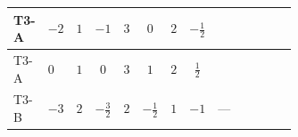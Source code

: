 \documentclass[8pt]{article}
\begin{document}
\begin{landscape}
\begin{longtable}{@{}llcccccc >{\raggedright\arraybackslash}p{0.21\linewidth} >{\raggedright\arraybackslash}p{0.21\linewidth} >{\raggedright\arraybackslash}p{0.21\linewidth}@{}}
\midrule
T3-A & $-2$ & $1$ & $-1$ & $3$ & $0$ & $2$ & $-\frac{1}{2}$ & \scriptsize\adjustbox{max width=\linewidth}{$\begin{gathered} {\lambda_{HS_2}^{(1)}} (2 T_{\nu}^{(2)}+6 \operatorname{Tr}\!\left({Y_d}\,\left({Y_d}\right)^{\dagger}\right)+2 \operatorname{Tr}\!\left({Y_e}\,\left({Y_e}\right)^{\dagger}\right)+6 \operatorname{Tr}\!\left({Y_u}\,\left({Y_u}\right)^{\dagger}\right)+4 {\lambda_{S_2}^{(A)}})\end{gathered}$} & \scriptsize\adjustbox{max width=\linewidth}{$\begin{gathered} -2 \operatorname{Tr}\!\left({y_2}\,\left({y_2}\right)^{\dagger}\,{Y_e}\,\left({Y_e}\right)^{\dagger}\right)\end{gathered}$} & \scriptsize\adjustbox{max width=\linewidth}{$\begin{gathered} +4 {\lambda_5} \left({\lambda_5}\right)^{*}\end{gathered}$} \\
\midrule
T3-A & $0$ & $1$ & $0$ & $3$ & $1$ & $2$ & $\frac{1}{2}$ & \scriptsize\adjustbox{max width=\linewidth}{$\begin{gathered} {\lambda_{HS_2}^{(1)}} (2 T_{\nu}^{(2)}+6 \operatorname{Tr}\!\left({Y_d}\,\left({Y_d}\right)^{\dagger}\right)+2 \operatorname{Tr}\!\left({Y_e}\,\left({Y_e}\right)^{\dagger}\right)+6 \operatorname{Tr}\!\left({Y_u}\,\left({Y_u}\right)^{\dagger}\right)+4 {\lambda_{S_2}^{(A)}})\end{gathered}$} & \scriptsize\adjustbox{max width=\linewidth}{$\begin{gathered} -2 \operatorname{Tr}\!\left({y_2}\,\left({y_2}\right)^{\dagger}\,{Y_e}\,\left({Y_e}\right)^{\dagger}\right)\end{gathered}$} & \scriptsize\adjustbox{max width=\linewidth}{$\begin{gathered} +4 {\lambda_5} \left({\lambda_5}\right)^{*}\end{gathered}$} \\
\midrule
T3-B & $-3$ & $2$ & $-\frac{3}{2}$ & $2$ & $-\frac{1}{2}$ & $1$ & $-1$ & --- & \scriptsize\adjustbox{max width=\linewidth}{$\begin{gathered} -2 \operatorname{Tr}\!\left({y_2}\,\left({y_2}\right)^{\dagger}\,{Y_e}\,\left({Y_e}\right)^{\dagger}\right)\end{gathered}$} & \scriptsize\adjustbox{max width=\linewidth}{$\begin{gathered} +6 {\lambda_5} \left({\lambda_5}\right)^{*}\end{gathered}$} \\

\end{longtable}
\end{landscape}
\end{document}
